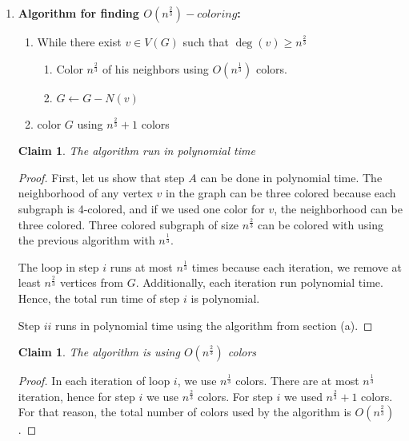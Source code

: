 \documentclass{article}
\newtheorem{claim}[section]{Claim}
\begin{document}
\begin{enumerate}
\begin{enumerate}
\begin{claim}
	The algorithm is using $O(\sqrt n)$ colors
\end{claim}
\begin{proof}
	In each iteration of loop $i$, we use two colors. There are at most $\sqrt{n}$ iteration, hence for step $i$ we use $2 \sqrt n = O(\sqrt n)$ colors.
	For step $i$ we used $\sqrt n + 1$ colors.
	For that reason, the total number of colors used by the algorithm is $O(\sqrt n)$.
\end{proof}
\item 
\textbf{Algorithm for finding $O(n^\frac{2}{3})-coloring$:}
	\begin{enumerate}
		\item While there exist $v \in V(G)$ such that $\deg(v) \geq n^\frac{2}{3}$
		\begin{enumerate}
			\item Color $n^\frac{2}{3}$ of his neighbors using $O(n^\frac{1}{3})$ colors.
			\item $G \leftarrow G - N(v)$
		\end{enumerate}
		\item color $G$ using $n^\frac{2}{3} + 1$ colors
	\end{enumerate}
	
	
	\begin{claim}
		The algorithm run in polynomial time
	\end{claim}
	\begin{proof}
		First, let us show that step $A$ can be done in polynomial time. The neighborhood of any vertex $v$ in the graph can be three colored because each subgraph is 4-colored, and if we used one color for $v$, the neighborhood can be three colored. Three colored subgraph of size $n^\frac{2}{3}$ can be colored with using the previous algorithm with $n^\frac{1}{3}$.
		
		The loop in step $i$ runs at most $n^\frac{1}{3}$ times because each iteration, we remove at least $n^\frac{2}{3}$ vertices from $G$. Additionally, each iteration run polynomial time. Hence, the total run time of step $i$ is polynomial.
		
		Step $ii$ runs in polynomial time using the algorithm from section (a).
	\end{proof}
	
	\begin{claim}
		The algorithm is using $O(n^\frac{2}{3})$ colors
	\end{claim}
	\begin{proof}
		In each iteration of loop $i$, we use $n^\frac{1}{3}$ colors. There are at most $n^\frac{1}{3}$ iteration, hence for step $i$ we use $n^\frac{2}{3}$ colors.
		For step $i$ we used $n^\frac{2}{3} + 1$ colors.
		For that reason, the total number of colors used by the algorithm is $O(n^\frac{2}{3})$.
	\end{proof}
\end{enumerate}

\end{enumerate}
\end{document}
